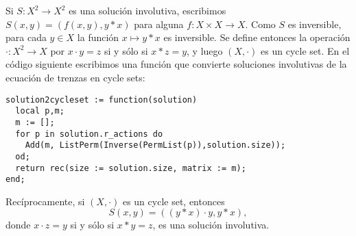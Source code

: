 \begin{block}
	Si $S\colon X^2\to X^2$ es una solución involutiva, escribimos
	$S(x,y)=(f(x,y),y*x)$ para alguna $f\colon X\times X\to X$.  Como $S$ es
	inversible, para cada $y\in X$ la función $x\mapsto y*x$ es inversible. Se
	define entonces la operación $\cdot\colon X^2\to X$ por $x\cdot y=z$ si y
	sólo si $x*z=y$, y luego $(X,\cdot)$ es un cycle set. En el código siguiente
	escribimos una función que convierte soluciones involutivas de la ecuación
	de trenzas en cycle sets:

	\begin{lstlisting}
solution2cycleset := function(solution)
  local p,m;
  m := [];
  for p in solution.r_actions do
    Add(m, ListPerm(Inverse(PermList(p)),solution.size));
  od;
  return rec(size := solution.size, matrix := m);
end;
	\end{lstlisting}

	Recíprocamente, si $(X,\cdot)$ es un cycle set, entonces 
	\[
		S(x,y)=\left( (y*x)\cdot y,y*x \right),
	\]
	donde $x\cdot z=y$ si y sólo si $x*y=z$, es una solución involutiva. 
\end{block}
